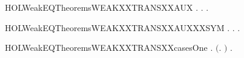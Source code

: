 \newcommand{\HOLWeakEQTheoremsWEAKXXTRANSXXANDXXEPS}{\UseVerbatim{HOLWeakEQTheoremsWEAKXXTRANSXXANDXXEPS}}
\begin{SaveVerbatim}{HOLWeakEQTheoremsWEAKXXTRANSXXAUX}
\HOLTokenTurnstile{} \HOLSymConst{\HOLTokenForall{}}  .
        \HOLTokenWeakTransBegin{} \HOLTokenWeakTransEnd {} \HOLSymConst{\HOLTokenImp{}}
       \HOLSymConst{\HOLTokenForall{}} .
             \HOLSymConst{\HOLTokenConj{}}    \HOLSymConst{\HOLTokenImp{}}
           \HOLSymConst{\HOLTokenExists{}}.  \HOLTokenWeakTransBegin{} \HOLTokenWeakTransEnd {} \HOLSymConst{\HOLTokenConj{}}   
\end{SaveVerbatim}
\newcommand{\HOLWeakEQTheoremsWEAKXXTRANSXXAUX}{\UseVerbatim{HOLWeakEQTheoremsWEAKXXTRANSXXAUX}}
\begin{SaveVerbatim}{HOLWeakEQTheoremsWEAKXXTRANSXXAUXXXSYM}
\HOLTokenTurnstile{} \HOLSymConst{\HOLTokenForall{}}  .
        \HOLTokenWeakTransBegin{} \HOLTokenWeakTransEnd {} \HOLSymConst{\HOLTokenImp{}}
       \HOLSymConst{\HOLTokenForall{}} .
             \HOLSymConst{\HOLTokenConj{}}    \HOLSymConst{\HOLTokenImp{}}
           \HOLSymConst{\HOLTokenExists{}}.  \HOLTokenWeakTransBegin{} \HOLTokenWeakTransEnd {} \HOLSymConst{\HOLTokenConj{}}   
\end{SaveVerbatim}
\newcommand{\HOLWeakEQTheoremsWEAKXXTRANSXXAUXXXSYM}{\UseVerbatim{HOLWeakEQTheoremsWEAKXXTRANSXXAUXXXSYM}}
\begin{SaveVerbatim}{HOLWeakEQTheoremsWEAKXXTRANSXXcasesOne}
\HOLTokenTurnstile{} \HOLSymConst{\HOLTokenForall{}}  .
        \HOLTokenWeakTransBegin{}\HOLTokenWeakTransEnd {} \HOLSymConst{\HOLTokenImp{}}
       \ensuremath{(}\HOLSymConst{\HOLTokenExists{}}.  \HOLTokenTransBegin\HOLConst{\ensuremath{\tau}}\HOLTokenTransEnd {} \HOLSymConst{\HOLTokenConj{}}  \HOLTokenWeakTransBegin{}\HOLTokenWeakTransEnd {}\ensuremath{)} \HOLSymConst{\HOLTokenDisj{}} \HOLSymConst{\HOLTokenExists{}}.  \HOLTokenTransBegin{}\HOLTokenTransEnd {} \HOLSymConst{\HOLTokenConj{}}   
\end{SaveVerbatim}
